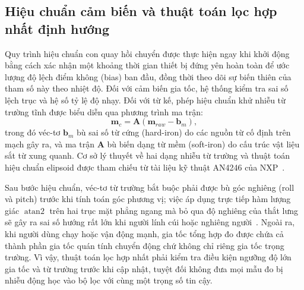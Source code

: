 \subsection{Hiệu chuẩn cảm biến và thuật toán lọc hợp nhất định hướng}
Quy trình hiệu chuẩn con quay hồi chuyển được thực hiện ngay khi khởi động bằng cách xác nhận một khoảng thời gian thiết bị đứng yên hoàn toàn để ước lượng độ lệch điểm không (bias) ban đầu, đồng thời theo dõi sự biến thiên của tham số này theo nhiệt độ. Đối với cảm biến gia tốc, hệ thống kiểm tra sai số lệch trục và hệ số tỷ lệ độ nhạy. Đối với từ kế, phép hiệu chuẩn khử nhiễu từ trường tĩnh được biểu diễn qua phương trình ma trận:
\begin{equation}
\boldsymbol m_c=\boldsymbol A(\boldsymbol m_{raw}-\boldsymbol b_m),
\end{equation}
trong đó véc-tơ $\boldsymbol b_m$ bù sai số từ cứng (hard-iron) do các nguồn từ cố định trên mạch gây ra, và ma trận $\boldsymbol A$ bù biến dạng từ mềm (soft-iron) do cấu trúc vật liệu sắt từ xung quanh. Cơ sở lý thuyết về hai dạng nhiễu từ trường và thuật toán hiệu chuẩn elipsoid được tham chiếu từ tài liệu kỹ thuật AN4246 của NXP~\cite{magcal}.

Sau bước hiệu chuẩn, véc-tơ từ trường bắt buộc phải được bù góc nghiêng (roll và pitch) trước khi tính toán góc phương vị; việc áp dụng trực tiếp hàm lượng giác $\operatorname{atan2}$ trên hai trục mặt phẳng ngang mà bỏ qua độ nghiêng của thắt lưng sẽ gây ra sai số hướng rất lớn khi người lính cúi hoặc nghiêng người~\cite{compass}. Ngoài ra, khi người dùng chạy hoặc vận động mạnh, gia tốc tổng hợp đo được chứa cả thành phần gia tốc quán tính chuyển động chứ không chỉ riêng gia tốc trọng trường. Vì vậy, thuật toán lọc hợp nhất phải kiểm tra điều kiện ngưỡng độ lớn gia tốc và từ trường trước khi cập nhật, tuyệt đối không đưa mọi mẫu đo bị nhiễu động học vào bộ lọc với cùng một trọng số tin cậy.


